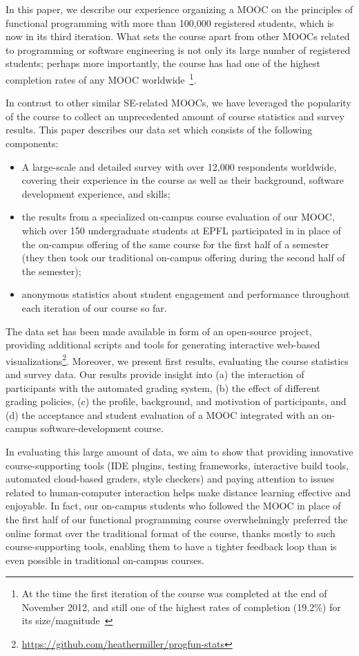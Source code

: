 \documentclass{sig-alternate}
\begin{document}
In this paper, we describe our experience organizing a MOOC on the principles of functional
programming with more than 100,000 registered students, which is now in its third iteration.
What sets the course apart from other MOOCs related to programming or software engineering is not only its large number of registered students; perhaps more importantly, the course has had one of the highest completion rates of any MOOC worldwide~\cite{Parr13}\footnote{At the time the first iteration of the course was completed at the end of November 2012, and still one of the highest rates of completion (19.2\%) for its size/magnitude~\cite{moocCompletionRates}}.

In contrast to other similar SE-related MOOCs, we have leveraged the popularity of the course to collect an unprecedented amount of course statistics and survey results. This paper describes our data set which consists of the following components:

\begin{itemize}
\item A large-scale and detailed survey with over 12,000 respondents worldwide, covering their experience in the course as well as their background, software development experience, and skills;
\item the results from a specialized on-campus course evaluation of our MOOC, which over 150 undergraduate students at EPFL participated in in place of the on-campus offering of the same course for the first half of a semester (they then took our traditional on-campus offering during the second half of the semester);
\item anonymous statistics about student engagement and performance throughout each iteration of our course so far.
\end{itemize}

The data set has been made available in form of an open-source project, providing additional scripts and tools for generating interactive web-based visualizations\footnote{\url{https://github.com/heathermiller/progfun-stats}}. Moreover, we present first results, evaluating the course statistics and survey data. Our results provide insight into (a) the interaction of participants with the automated grading system, (b) the effect of different grading policies, (c) the profile, background, and motivation of participants, and (d) the acceptance and student evaluation of a MOOC integrated with an on-campus software-development course.

In evaluating this large amount of data, we aim to show that providing innovative course-supporting tools (IDE plugins, testing frameworks, interactive build tools, automated cloud-based graders, style checkers) and paying attention to issues related to human-computer interaction helps make distance learning effective and enjoyable. In fact, our on-campus students who followed the MOOC in place of the first half of our functional programming course overwhelmingly preferred the online format over the traditional format of the course, thanks mostly to such course-supporting tools, enabling them to have a tighter feedback loop than is even possible in traditional on-campus courses.
\end{document}
